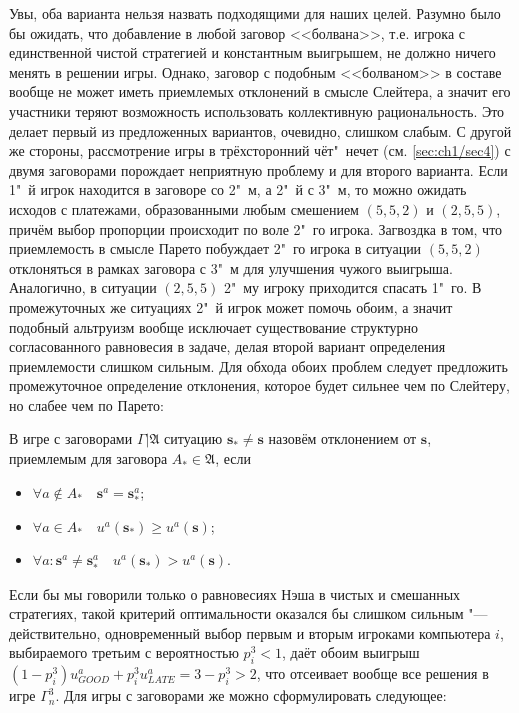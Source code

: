 Увы, оба варианта нельзя назвать подходящими для наших целей. Разумно было бы ожидать, что добавление в любой заговор <<болвана>>, т.е. игрока с единственной чистой стратегией и константным выигрышем, не должно ничего менять в решении игры. Однако, заговор с подобным <<болваном>> в составе вообще не может иметь приемлемых отклонений в смысле Слейтера, а значит его участники теряют возможность использовать коллективную рациональность. Это делает первый из предложенных вариантов, очевидно, слишком слабым. С другой же стороны, рассмотрение игры в трёхсторонний чёт"~нечет (см. \ref{sec:ch1/sec4}) с двумя заговорами порождает неприятную проблему и для второго варианта. Если 1"~й игрок находится в заговоре со 2"~м, а 2"~й с 3"~м, то можно ожидать исходов с платежами, образованными любым смешением $(5,5,2)$ и $(2,5,5)$, причём выбор пропорции происходит по воле 2"~го игрока. Загвоздка в том, что приемлемость в смысле Парето побуждает 2"~го игрока в ситуации $(5,5,2)$ отклоняться в рамках заговора с 3"~м для улучшения чужого выигрыша. Аналогично, в ситуации $(2,5,5)$ 2"~му игроку приходится спасать 1"~го. В промежуточных же ситуациях 2"~й игрок может помочь обоим, а значит подобный альтруизм вообще исключает существование структурно согласованного равновесия в задаче, делая второй вариант определения приемлемости слишком сильным. Для обхода обоих проблем следует предложить промежуточное определение отклонения, которое будет сильнее чем по Слейтеру, но слабее чем по Парето:
\begin{definition}
	В игре с заговорами $\Gamma | \mathfrak{A}$ ситуацию $\mathbf{s}_* \neq \mathbf{s}$ назовём отклонением от $\mathbf{s}$, приемлемым для заговора $A_* \in \mathfrak{A}$, если
	\begin{itemize}
		\item $\forall a \notin A_* \quad \mathbf{s}^a = \mathbf{s}_*^a$;
		\item $\forall a \in A_* \quad u^a(\mathbf{s}_*) \geq u^a(\mathbf{s})$;
		\item $\forall a : \mathbf{s}^a \neq \mathbf{s}_*^a \quad u^a(\mathbf{s}_*) > u^a(\mathbf{s})$.
	\end{itemize}
\end{definition}

Если бы мы говорили только о равновесиях Нэша в чистых и смешанных стратегиях, такой критерий оптимальности оказался бы слишком сильным "--- действительно, одновременный выбор первым и вторым игроками компьютера $i$, выбираемого третьим с вероятностью $p_i^3 < 1$, даёт обоим выигрыш $(1 - p_i^3) u^a_{GOOD} + p_i^3 u^a_{LATE} = 3 - p_i^3 > 2$, что отсеивает вообще все решения в игре $\Gamma^3_n$. Для игры с заговорами же можно сформулировать следующее:

